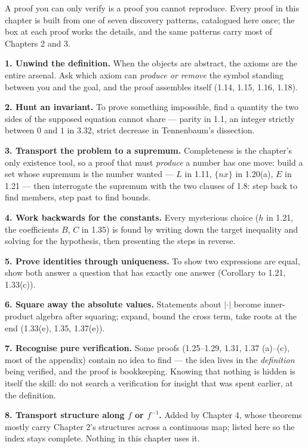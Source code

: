 \begin{roadmap}
A proof you can only verify is a proof you cannot reproduce. Every proof in
this chapter is built from one of seven discovery patterns, catalogued here
once; the box at each proof works the details, and the same patterns carry
most of Chapters 2 and 3.

\smallskip
\textbf{1. Unwind the definition.} When the objects are abstract, the axioms
are the entire arsenal. Ask which axiom can \emph{produce or remove} the
symbol standing between you and the goal, and the proof assembles itself
(1.14, 1.15, 1.16, 1.18).

\smallskip
\textbf{2. Hunt an invariant.} To prove something impossible, find a quantity
the two sides of the supposed equation cannot share --- parity in 1.1, an
integer strictly between $0$ and $1$ in 3.32, strict decrease in Tennenbaum's
dissection.

\smallskip
\textbf{3. Transport the problem to a supremum.} Completeness is the
chapter's only existence tool, so a proof that must \emph{produce} a number
has one move: build a set whose supremum is the number wanted --- $L$ in
1.11, $\{nx\}$ in 1.20(a), $E$ in 1.21 --- then interrogate the supremum with
the two clauses of 1.8: step back to find members, step past to find bounds.

\smallskip
\textbf{4. Work backwards for the constants.} Every mysterious choice ($h$ in
1.21, the coefficients $B$, $C$ in 1.35) is found by writing down the target
inequality and solving for the hypothesis, then presenting the steps in
reverse.

\smallskip
\textbf{5. Prove identities through uniqueness.} To show two expressions are
equal, show both answer a question that has exactly one answer (Corollary to
1.21, 1.33(c)).

\smallskip
\textbf{6. Square away the absolute values.} Statements about $|\cdot|$
become inner-product algebra after squaring; expand, bound the cross term,
take roots at the end (1.33(e), 1.35, 1.37(e)).

\smallskip
\textbf{7. Recognise pure verification.} Some proofs (1.25--1.29, 1.31, 1.37
(a)--(c), most of the appendix) contain no idea to find --- the idea lives in
the \emph{definition} being verified, and the proof is bookkeeping. Knowing
that nothing is hidden is itself the skill: do not search a verification for
insight that was spent earlier, at the definition.

\smallskip
\textbf{8. Transport structure along $f$ or $f^{-1}$.} Added by Chapter 4,
whose theorems mostly carry Chapter 2's structures across a continuous map;
listed here so the index stays complete. Nothing in this chapter uses it.
\end{roadmap}

